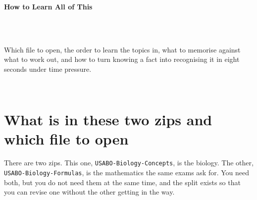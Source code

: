 


\begin{titlepage}\thispagestyle{empty}
\vspace*{0.14\textheight}
\noindent{\color{tiercore}\rule{\textwidth}{5pt}}\\[3pt]
\noindent{\color{bioline}\rule{\textwidth}{1pt}}\\[26pt]
\\[12pt]
\noindent\begin{minipage}{\textwidth}\raggedright
{\sffamily\bfseries\fontsize{30}{34}\selectfont\color{bioink}%
 \hyphenchar{} How to Learn All of This\par}\end{minipage}\\[16pt]
\noindent{\color{biogreen}\rule{\textwidth}{1.4pt}}\\[10pt]
\noindent\begin{minipage}{\textwidth}\raggedright
{\fontsize{10.5}{14}\selectfont\color{biogreen}%
Which file to open, the order to learn the topics in, what to memorise against what to
work out, and how to turn knowing a fact into recognising it in eight seconds under
time pressure.\par}\end{minipage}
\vfill
\noindent{\color{bioline}\rule{\textwidth}{1pt}}\\[3pt]
\noindent{\color{tiercore}\rule{\textwidth}{5pt}}
\end{titlepage}
\tableofcontents
\clearpage

\section{What is in these two zips and which file to open}

There are two zips. This one, \texttt{USABO-Biology-Concepts}, is the biology. The other,
\texttt{USABO-Biology-Formulas}, is the mathematics the same exams ask for. You need both,
but you do not need them at the same time, and the split exists so that you can revise
one without the other getting in the way.

